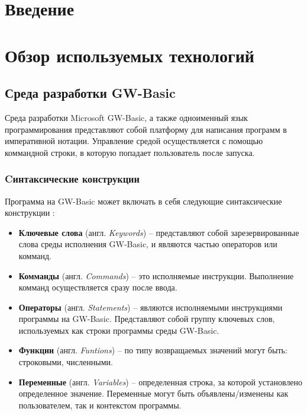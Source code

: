 \documentclass[12pt]{article}
\begin{document}
	\section{Введение}
	\newpage
	\section{Обзор используемых технологий}	
		\subsection{Среда разработки GW-Basic}
			\hspace{\parindent} Среда разработки Microsoft GW-Basic, а также одноименный язык программирования представляют собой платформу для написания программ в императивной нотации. 
			Управление средой осуществляется с помощью коммандной строки, в которую попадает пользователь после запуска.
			\subsubsection{Cинтаксические конструкции}
			\label{subsec:basicKeywords}
			\hspace{\parindent} Программа на GW-Basic может включать в себя следующие синтаксические конструкции \cite{basicManual}:
			\begin{itemize}
				\item {\bf Ключевые слова} (англ. {\it Keywords}) -- представляют собой зарезервированные слова среды исполнения GW-Basic, и являются частью операторов или комманд. 				
				\item {\bf Комманды} (англ. { \it Commands}) -- это исполняемые инструкции. Выполнение комманд осуществляется сразу после ввода.
				\item {\bf Операторы} (англ. {\it Statements}) -- являются исполняемыми инструкциями программы на GW-Basic. Представляют собой группу ключевых слов, используемых как строки программы среды GW-Basic.
				\item {\bf Функции} (англ. {\it Funtions}) -- по типу возвращаемых значений могут быть: строковыми, численными. 
				\item {\bf Переменные} (англ. {\it Variables}) -- определенная строка, за которой установлено определенное значение. Переменные могут быть объявлены/изменены как пользователем, так и контекстом программы.
			\end{itemize}
\end{document}
